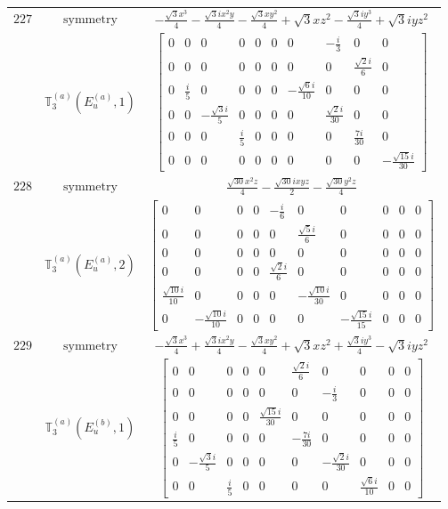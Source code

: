 \documentclass[fleqn,8pt,landscape]{jsarticle}
\begin{document}
\begin{longtable}{ccc}
$ 227 $ & $ \text{symmetry} $ & $ - \frac{\sqrt{3} x^{3}}{4} - \frac{\sqrt{3} i x^{2} y}{4} - \frac{\sqrt{3} x y^{2}}{4} + \sqrt{3} x z^{2} - \frac{\sqrt{3} i y^{3}}{4} + \sqrt{3} i y z^{2} $ \\
$  $ & $ \mathbb{T}_{3}^{(a)}(E_{u}^{(a)},1) $ & $ \begin{bmatrix} 0 & 0 & 0 & 0 & 0 & 0 & 0 & - \frac{i}{3} & 0 & 0 \\ 0 & 0 & 0 & 0 & 0 & 0 & 0 & 0 & \frac{\sqrt{2} i}{6} & 0 \\ 0 & \frac{i}{5} & 0 & 0 & 0 & 0 & - \frac{\sqrt{6} i}{10} & 0 & 0 & 0 \\ 0 & 0 & - \frac{\sqrt{3} i}{5} & 0 & 0 & 0 & 0 & \frac{\sqrt{2} i}{30} & 0 & 0 \\ 0 & 0 & 0 & \frac{i}{5} & 0 & 0 & 0 & 0 & \frac{7 i}{30} & 0 \\ 0 & 0 & 0 & 0 & 0 & 0 & 0 & 0 & 0 & - \frac{\sqrt{15} i}{30} \end{bmatrix} $ \\ \hline
$ 228 $ & $ \text{symmetry} $ & $ \frac{\sqrt{30} x^{2} z}{4} - \frac{\sqrt{30} i x y z}{2} - \frac{\sqrt{30} y^{2} z}{4} $ \\
$  $ & $ \mathbb{T}_{3}^{(a)}(E_{u}^{(a)},2) $ & $ \begin{bmatrix} 0 & 0 & 0 & 0 & - \frac{i}{6} & 0 & 0 & 0 & 0 & 0 \\ 0 & 0 & 0 & 0 & 0 & \frac{\sqrt{5} i}{6} & 0 & 0 & 0 & 0 \\ 0 & 0 & 0 & 0 & 0 & 0 & 0 & 0 & 0 & 0 \\ 0 & 0 & 0 & 0 & \frac{\sqrt{2} i}{6} & 0 & 0 & 0 & 0 & 0 \\ \frac{\sqrt{10} i}{10} & 0 & 0 & 0 & 0 & - \frac{\sqrt{10} i}{30} & 0 & 0 & 0 & 0 \\ 0 & - \frac{\sqrt{10} i}{10} & 0 & 0 & 0 & 0 & - \frac{\sqrt{15} i}{15} & 0 & 0 & 0 \end{bmatrix} $ \\ \hline
$ 229 $ & $ \text{symmetry} $ & $ - \frac{\sqrt{3} x^{3}}{4} + \frac{\sqrt{3} i x^{2} y}{4} - \frac{\sqrt{3} x y^{2}}{4} + \sqrt{3} x z^{2} + \frac{\sqrt{3} i y^{3}}{4} - \sqrt{3} i y z^{2} $ \\
$  $ & $ \mathbb{T}_{3}^{(a)}(E_{u}^{(b)},1) $ & $ \begin{bmatrix} 0 & 0 & 0 & 0 & 0 & \frac{\sqrt{2} i}{6} & 0 & 0 & 0 & 0 \\ 0 & 0 & 0 & 0 & 0 & 0 & - \frac{i}{3} & 0 & 0 & 0 \\ 0 & 0 & 0 & 0 & \frac{\sqrt{15} i}{30} & 0 & 0 & 0 & 0 & 0 \\ \frac{i}{5} & 0 & 0 & 0 & 0 & - \frac{7 i}{30} & 0 & 0 & 0 & 0 \\ 0 & - \frac{\sqrt{3} i}{5} & 0 & 0 & 0 & 0 & - \frac{\sqrt{2} i}{30} & 0 & 0 & 0 \\ 0 & 0 & \frac{i}{5} & 0 & 0 & 0 & 0 & \frac{\sqrt{6} i}{10} & 0 & 0 \end{bmatrix} $ \\ \hline

\end{longtable}
\end{document}

